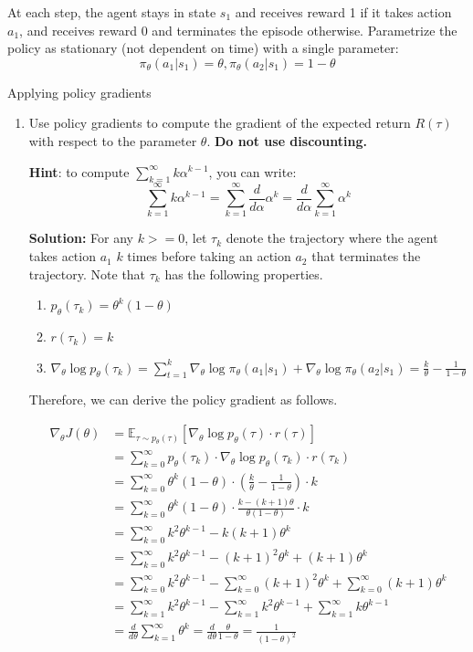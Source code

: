 \documentclass{article}
\begin{document}
At each step, the agent stays in state $s_1$ and receives reward 1 if it takes action $a_1$, and receives reward 0 and terminates the episode otherwise.
Parametrize the policy as stationary (not dependent on time) with a single parameter:
\[\pi_\theta(a_1|s_1) = \theta, \pi_\theta(a_2|s_1) = 1-\theta\]

\begin{enumerate}
 Applying policy gradients
\begin{enumerate}
    \item Use policy gradients to compute the gradient of the expected return $R(\tau)$ with respect to the parameter $\theta$. \textbf{Do not use discounting.}

    \textbf{Hint}: to compute $\sum_{k=1}^\infty k\alpha^{k-1}$, you can write:
    \[\sum_{k=1}^\infty k\alpha^{k-1} = \sum_{k=1}^\infty \frac{d}{d\alpha}\alpha^k = \frac{d}{d\alpha}\sum_{k=1}^\infty\alpha^k\]

\textbf{Solution:} For any $k >= 0$, let $\tau_k$ denote the trajectory where the agent takes action $a_1$ $k$ times before taking an action $a_2$ that terminates the trajectory. Note that $\tau_k$ has the following properties.
\begin{enumerate}
    \item $p_\theta(\tau_k) = \theta^k(1-\theta)$
    \item $r(\tau_k) = k$
    \item $\nabla_\theta \log p_\theta(\tau_k) = \sum_{t=1}^k \nabla_\theta \log \pi_\theta(a_1 | s_1) + \nabla_\theta \log \pi_\theta(a_2 | s_1) = \frac{k}{\theta} - \frac{1}{1 - \theta}$
\end{enumerate}

Therefore, we can derive the policy gradient as follows.

\begin{align}
\nabla_\theta J(\theta) &= \mathbb{E}_{\tau \sim p_\theta(\tau)}[\nabla_\theta \log p_\theta(\tau) \cdot r(\tau)] \\ 
&= \sum_{k=0}^{\infty} p_\theta(\tau_k) \cdot \nabla_\theta \log p_\theta(\tau_k) \cdot r(\tau_k) \\
&= \sum_{k=0}^{\infty} \theta^k(1-\theta) \cdot (\frac{k}{\theta} - \frac{1}{1 - \theta}) \cdot k \\
&= \sum_{k=0}^{\infty} \theta^k(1-\theta) \cdot \frac{k - (k+1)\theta}{\theta(1-\theta)} \cdot k \\
&= \sum_{k=0}^{\infty} k^2\theta^{k-1} - k(k+1)\theta^k \\
&= \sum_{k=0}^{\infty} k^2\theta^{k-1} - (k+1)^2\theta^k + (k+1)\theta^k \\
&= \sum_{k=0}^{\infty} k^2\theta^{k-1} - \sum_{k=0}^{\infty}(k+1)^2\theta^k + \sum_{k=0}^{\infty}(k+1)\theta^k \\
&= \sum_{k=1}^{\infty} k^2\theta^{k-1} - \sum_{k=1}^{\infty} k^2\theta^{k-1} + \sum_{k=1}^{\infty}k\theta^{k-1} \\
&= \frac{d}{d\theta}\sum_{k=1}^{\infty}\theta^k = \frac{d}{d\theta}\frac{\theta}{1-\theta} = \frac{1}{(1-\theta)^2}
\end{align}


\end{enumerate}
\end{enumerate}
\end{document}
